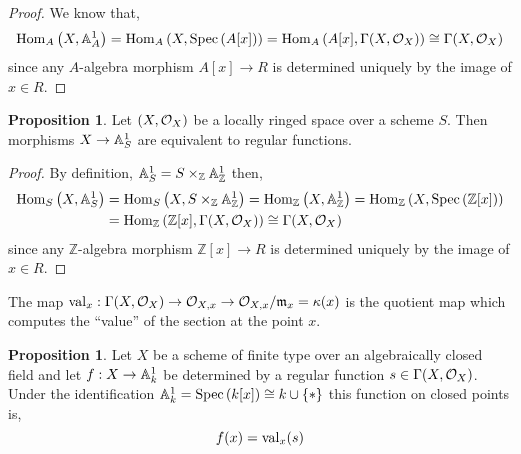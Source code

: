 \documentclass[12pt]{extarticle}
\newcommand{\Hom}[3]{\mathrm{Hom}_{#1}\left( #2, #3 \right)}
\newcommand{\Z}{\mathbb{Z}}
\theoremstyle{definition}
\newtheorem{proposition}[theorem]{Proposition}
\newenvironment{definition}[1][Definition:]{\begin{trivlist}
\item[\hskip \labelsep {\bfseries #1}]}{\end{trivlist}}
\newcommand{\m}{\mathfrak{m}}
\begin{document}
\begin{proof}
We know that,
\[ \Hom{A}{X}{\A^1_A} = \Hom{A}{X}{\Spec{A[x]}} = \Hom{A}{A[x]}{\Gamma(X, \struct{X})} \cong \Gamma(X, \struct{X}) \]
since any $A$-algebra morphism $A[x] \to R$ is determined uniquely by the image of $x \in R$. 
\end{proof}

\begin{proposition}
Let $(X, \mathcal{O}_{X})$ be a locally ringed space over a scheme $S$. Then morphisms $X \to \mathbb{A}^1_S$ are equivalent to regular functions.
\end{proposition}

\begin{proof}
By definition, $\A^1_S = S \times_\Z \A^1_\Z$ then,
\begin{align*}
\Hom{S}{X}{\A^1_S} & = \Hom{S}{X}{S \times_\Z \A^1_\Z} = \Hom{\Z}{X}{\A^1_\Z} = \Hom{\Z}{X}{\Spec{\Z[x]}} 
\\
& = \Hom{\Z}{\Z[x]}{\Gamma(X, \struct{X})} \cong \Gamma(X, \struct{X})
\end{align*}
since any $\Z$-algebra morphism $\Z[x] \to R$ is determined uniquely by the image of $x \in R$. 
\end{proof}

\begin{definition}
The map $\val_x : \Gamma(X, \struct{X}) \to \stalk{X}{x} \to \stalk{X}{x} / \m_x = \kappa(x)$ is the quotient map which computes the ``value'' of the section at the point $x$. 
\end{definition}


\begin{proposition}
Let $X$ be a scheme of finite type over an algebraically closed field and let $f : X \to \mathbb{A}^1_k$ be determined by a regular function $s \in \Gamma(X, \mathcal{O}_{X})$. Under the identification $\mathbb{A}^1_k = \mathrm{Spec}\left(k[x]\right) \cong k \cup \{ * \}$ this function on closed points is,
\[ f(x) = \mathrm{val}_x(s) \]
\end{proposition}
\end{document}
